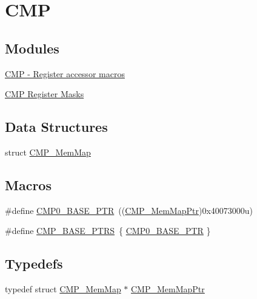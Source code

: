 \hypertarget{group___c_m_p___peripheral}{}\section{C\+MP}
\label{group___c_m_p___peripheral}
\subsection*{Modules}
\begin{DoxyCompactItemize}
\item 
\hyperlink{group___c_m_p___register___accessor___macros}{C\+M\+P -\/ Register accessor macros}
\item 
\hyperlink{group___c_m_p___register___masks}{C\+M\+P Register Masks}
\end{DoxyCompactItemize}
\subsection*{Data Structures}
\begin{DoxyCompactItemize}
\item 
struct \hyperlink{struct_c_m_p___mem_map}{C\+M\+P\+\_\+\+Mem\+Map}
\end{DoxyCompactItemize}
\subsection*{Macros}
\begin{DoxyCompactItemize}
\item 
\#define \hyperlink{group___c_m_p___peripheral_ga5a7a6b1d0743a05435ba5cb2dc2b3431}{C\+M\+P0\+\_\+\+B\+A\+S\+E\+\_\+\+P\+TR}~((\hyperlink{group___c_m_p___peripheral_ga6f5d370df3839e41b771c2d0b89cbb83}{C\+M\+P\+\_\+\+Mem\+Map\+Ptr})0x40073000u)
\item 
\#define \hyperlink{group___c_m_p___peripheral_gacc69654296499d45b2060956a3c8e97f}{C\+M\+P\+\_\+\+B\+A\+S\+E\+\_\+\+P\+T\+RS}~\{ \hyperlink{group___c_m_p___peripheral_ga5a7a6b1d0743a05435ba5cb2dc2b3431}{C\+M\+P0\+\_\+\+B\+A\+S\+E\+\_\+\+P\+TR} \}
\end{DoxyCompactItemize}
\subsection*{Typedefs}
\begin{DoxyCompactItemize}
\item 
typedef struct \hyperlink{struct_c_m_p___mem_map}{C\+M\+P\+\_\+\+Mem\+Map} $\ast$ \hyperlink{group___c_m_p___peripheral_ga6f5d370df3839e41b771c2d0b89cbb83}{C\+M\+P\+\_\+\+Mem\+Map\+Ptr}
\end{DoxyCompactItemize}


